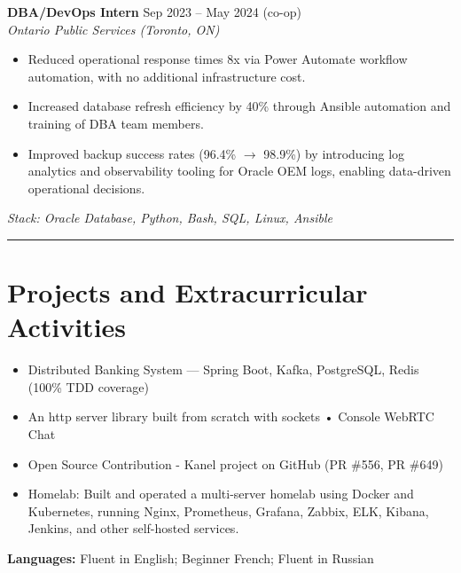 \documentclass[10pt,a4paper]{article}
\newcommand{\sectiondivider}{\vspace{0.35em}\hrule\vspace{0.45em}}
\begin{document}
\vspace{0.45em}

\textbf{DBA/DevOps Intern} \hfill Sep 2023 -- May 2024 (co-op)\\
\textit{Ontario Public Services (Toronto, ON)}
\begin{itemize}
    \item Reduced operational response times 8x via Power Automate workflow automation, with no additional infrastructure cost.
    \item Increased database refresh efficiency by 40\% through Ansible automation and training of DBA team members.
    \item Improved backup success rates (96.4\% $\rightarrow$ 98.9\%) by introducing log analytics and observability tooling for Oracle OEM logs,
    enabling data-driven operational decisions.
\end{itemize}
\textit{Stack: Oracle Database, Python, Bash, SQL, Linux, Ansible}

\sectiondivider
\section*{Projects and Extracurricular Activities}
\begin{itemize}
    \item Distributed Banking System --- Spring Boot, Kafka, PostgreSQL, Redis (100\% TDD coverage)
    \item An http server library built from scratch with sockets • Console WebRTC Chat
    \item Open Source Contribution - Kanel project on GitHub (PR \#556, PR \#649)
    \item Homelab: Built and operated a multi-server homelab using Docker and Kubernetes, running Nginx, Prometheus, Grafana,
    Zabbix, ELK, Kibana, Jenkins, and other self-hosted services.
\end{itemize}

\textbf{Languages:} Fluent in English; Beginner French; Fluent in Russian
\end{document}
